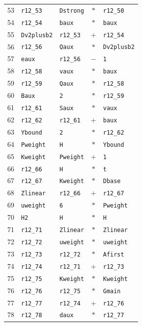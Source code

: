 \begin{longtable}{rllcl}
53 & \texttt{r12\_53} & \texttt{Dstrong} & $*$ & \texttt{r12\_50}\\
54 & \texttt{r12\_54} & \texttt{baux} & $*$ & \texttt{baux}\\
55 & \texttt{Dv2plusb2} & \texttt{r12\_53} & $+$ & \texttt{r12\_54}\\
56 & \texttt{r12\_56} & \texttt{Qaux} & $*$ & \texttt{Dv2plusb2}\\
57 & \texttt{eaux} & \texttt{r12\_56} & $-$ & \texttt{1}\\
58 & \texttt{r12\_58} & \texttt{vaux} & $*$ & \texttt{baux}\\
59 & \texttt{r12\_59} & \texttt{Qaux} & $*$ & \texttt{r12\_58}\\
60 & \texttt{Baux} & \texttt{2} & $*$ & \texttt{r12\_59}\\
61 & \texttt{r12\_61} & \texttt{Saux} & $*$ & \texttt{vaux}\\
62 & \texttt{r12\_62} & \texttt{r12\_61} & $+$ & \texttt{baux}\\
63 & \texttt{Ybound} & \texttt{2} & $*$ & \texttt{r12\_62}\\
64 & \texttt{Pweight} & \texttt{H} & $*$ & \texttt{Ybound}\\
65 & \texttt{Kweight} & \texttt{Pweight} & $+$ & \texttt{1}\\
66 & \texttt{r12\_66} & \texttt{H} & $*$ & \texttt{t}\\
67 & \texttt{r12\_67} & \texttt{Kweight} & $*$ & \texttt{Dbase}\\
68 & \texttt{Zlinear} & \texttt{r12\_66} & $+$ & \texttt{r12\_67}\\
69 & \texttt{uweight} & \texttt{6} & $*$ & \texttt{Pweight}\\
70 & \texttt{H2} & \texttt{H} & $*$ & \texttt{H}\\
71 & \texttt{r12\_71} & \texttt{Zlinear} & $*$ & \texttt{Zlinear}\\
72 & \texttt{r12\_72} & \texttt{uweight} & $*$ & \texttt{uweight}\\
73 & \texttt{r12\_73} & \texttt{r12\_72} & $*$ & \texttt{Afirst}\\
74 & \texttt{r12\_74} & \texttt{r12\_71} & $+$ & \texttt{r12\_73}\\
75 & \texttt{r12\_75} & \texttt{Kweight} & $*$ & \texttt{Kweight}\\
76 & \texttt{r12\_76} & \texttt{r12\_75} & $*$ & \texttt{Gmain}\\
77 & \texttt{r12\_77} & \texttt{r12\_74} & $+$ & \texttt{r12\_76}\\
78 & \texttt{r12\_78} & \texttt{daux} & $*$ & \texttt{r12\_77}\\

\end{longtable}
